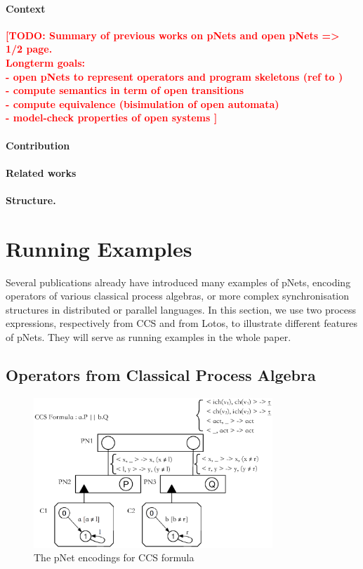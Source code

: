\documentclass{lncs/llncs}
\newcommand{\TODO}[1]{\textcolor{red}{\textbf{[TODO:#1]}}}
\begin{document}
\paragraph{Context}
\TODO{
  Summary of previous works on pNets and open pNets => 1/2 page.\\
  Longterm goals:\\
  - open pNets to represent operators and program skeletons (ref to
  \cite{HMZ:PDP15})\\
  - compute semantics in term of open transitions\\
  - compute equivalence (bisimulation of open automata)\\
  - model-check properties of open systems
  }
\paragraph{Contribution}

\paragraph{Related works}



\paragraph{Structure.}

\section{Running Examples}
Several publications \cite{HMZ:PDP15,henrio:Forte2016} already have introduced
many examples of pNets, encoding
operators of various classical process algebras, or more complex
synchronisation structures in distributed or parallel languages.
In this section, we use two process expressions, respectively from CCS
and from Lotos, to illustrate different features of pNets. They will
serve as running examples in the whole paper.  


\subsection{Operators from Classical Process Algebra}

\begin{figure}[h]
  \centerline{\includegraphics[width=9cm]{XFIG/CCS1}}
  \caption{The pNet encodings for CCS formula}  \label{schema:ccs-pnets}
\end{figure}
\end{document}
